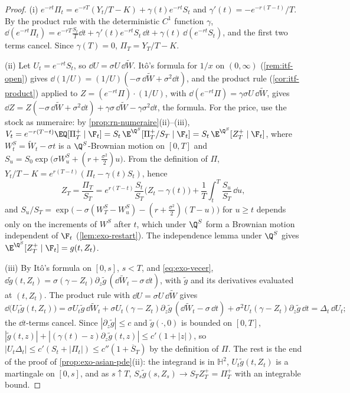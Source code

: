 \begin{proof}
(i) $e^{-rt}\Pi_t=e^{-rT}(Y_t/T-K)+\gamma(t)e^{-rt}S_t$ and $\gamma'(t)=-e^{-r(T-t)}/T$. By the
product rule with the deterministic $C^1$ function $\gamma$,
$\dd(e^{-rt}\Pi_t)=e^{-rT}\frac{S_t}T\dd t+\gamma'(t)e^{-rt}S_t\,\dd t+\gamma(t)\,\dd(e^{-rt}S_t)$, and the
first two terms cancel. Since $\gamma(T)=0$, $\Pi_T=Y_T/T-K$.

(ii) Let $U_t=e^{-rt}S_t$, so $\dd U=\sigma U\,\dd\widetilde W$. It\^o's formula for $1/x$ on
$(0,\infty)$ (\cref{rem:itf-open}) gives $\dd(1/U)=(1/U)(-\sigma\,\dd\widetilde W+\sigma^2\dd t)$, and
the product rule (\cref{cor:itf-product}) applied to $Z=(e^{-rt}\Pi)\cdot(1/U)$, with
$\dd(e^{-rt}\Pi)=\gamma\sigma U\,\dd\widetilde W$, gives
$\dd Z=Z(-\sigma\,\dd\widetilde W+\sigma^2\dd t)+\gamma\sigma\,\dd\widetilde W-\gamma\sigma^2\dd t$,
the formula. For the price, use the stock as numeraire: by \cref{prop:rn-numeraire}(ii)--(iii),
$V_t=e^{-r(T-t)}\EQ[\Pi_T^+\mid\F_t]=S_t\,\E^{\Q^S}[\Pi_T^+/S_T\mid\F_t]=S_t\,\E^{\Q^S}[Z_T^+\mid\F_t]$,
where $W^S_t=\widetilde W_t-\sigma t$ is a $\Q^S$-Brownian motion on $[0,T]$ and
$S_u=S_0\exp\big(\sigma W^S_u+(r+\frac{\sigma^2}2)u\big)$. From the definition of $\Pi$,
$Y_t/T-K=e^{r(T-t)}(\Pi_t-\gamma(t)S_t)$, hence
\[
  Z_T=\frac{\Pi_T}{S_T}=e^{r(T-t)}\frac{S_t}{S_T}\big(Z_t-\gamma(t)\big)+\frac1T\int_t^T\frac{S_u}{S_T}\,\dd u ,
\]
and $S_u/S_T=\exp\big(-\sigma(W^S_T-W^S_u)-(r+\frac{\sigma^2}2)(T-u)\big)$ for $u\ge t$ depends only
on the increments of $W^S$ after $t$, which under $\Q^S$ form a Brownian motion independent of
$\F_t$ (\cref{lem:exo-restart}). The independence lemma under $\Q^S$ gives
$\E^{\Q^S}[Z_T^+\mid\F_t]=g(t,Z_t)$.

(iii) By It\^o's formula on $[0,s]$, $s<T$, and \eqref{eq:exo-vecer}, $\dd\tilde g(t,Z_t)
=\sigma(\gamma-Z_t)\partial_z\tilde g\,(\dd\widetilde W_t-\sigma\,\dd t)$, with $\tilde g$ and its
derivatives evaluated at $(t,Z_t)$. The product rule with $\dd U=\sigma U\,\dd\widetilde W$ gives
\[
  \dd\big(U_t\tilde g(t,Z_t)\big)=\sigma U_t\tilde g\,\dd\widetilde W_t+\sigma U_t(\gamma-Z_t)\partial_z\tilde g\,
  (\dd\widetilde W_t-\sigma\,\dd t)+\sigma^2U_t(\gamma-Z_t)\partial_z\tilde g\,\dd t=\Delta_t\,\dd U_t ;
\]
the $\dd t$-terms cancel. Since $|\partial_z\tilde g|\le c$ and $\tilde g(\cdot,0)$ is bounded on
$[0,T]$, $|\tilde g(t,z)|+|(\gamma(t)-z)\partial_z\tilde g(t,z)|\le c'(1+|z|)$, so
$|U_t\Delta_t|\le c'(S_t+|\Pi_t|)\le c''(1+\overline S_T)$ by the definition of $\Pi$. The rest is
the end of the proof of \cref{prop:exo-asian-pde}(ii): the integrand is in $\mathbb H^2$,
$U_t\tilde g(t,Z_t)$ is a martingale on $[0,s]$, and as $s\uparrow T$,
$S_s\tilde g(s,Z_s)\to S_TZ_T^+=\Pi_T^+$ with an integrable bound.
\end{proof}

